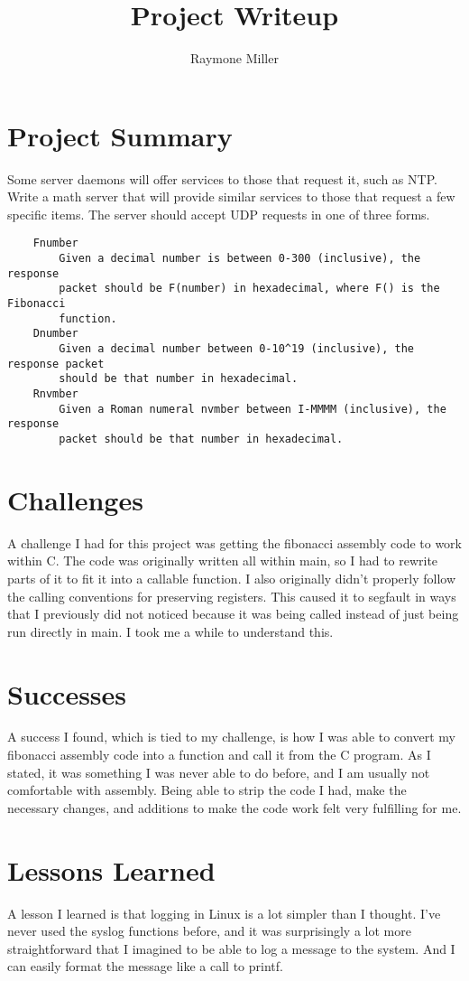 \documentclass{article}
\title{Project Writeup}
\author{Raymone Miller}
\begin{document}
  \maketitle

  \section{Project Summary}
  Some server daemons will offer services to those that request it, such as
  NTP. Write a math server that will provide similar services to those that
  request a few specific items. The server should accept UDP requests in one
  of three forms.
  \begin{verbatim}
    Fnumber
        Given a decimal number is between 0-300 (inclusive), the response
        packet should be F(number) in hexadecimal, where F() is the Fibonacci
        function.
    Dnumber
        Given a decimal number between 0-10^19 (inclusive), the response packet
        should be that number in hexadecimal.
    Rnvmber
        Given a Roman numeral nvmber between I-MMMM (inclusive), the response
        packet should be that number in hexadecimal.
  \end{verbatim}

  \section{Challenges}
  A challenge I had for this project was getting the fibonacci assembly code
  to work within C. The code was originally written all within main, so I had
  to rewrite parts of it to fit it into a callable function. I also originally
  didn't properly follow the calling conventions for preserving registers.
  This caused it to segfault in ways that I previously did not noticed because
  it was being called instead of just being run directly in main. I took me a
  while to understand this.

  \section{Successes}
  A success I found, which is tied to my challenge, is how I was able to
  convert my fibonacci assembly code into a function and call it from the C
  program. As I stated, it was something I was never able to do before, and I
  am usually not comfortable with assembly. Being able to strip the code I had,
  make the necessary changes, and additions to make the code work felt very
  fulfilling for me.

  \section{Lessons Learned}
  A lesson I learned is that logging in Linux is a lot simpler than I thought.
  I've never used the syslog functions before, and it was surprisingly a lot
  more straightforward that I imagined to be able to log a message to the
  system. And I can easily format the message like a call to printf.
\end{document}
